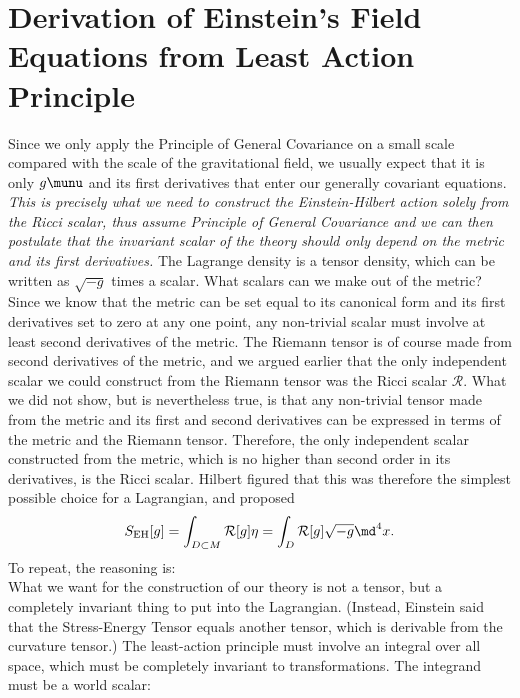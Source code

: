 \newpage
\section{Derivation of Einstein's Field Equations from Least Action Principle}

Since we only apply the Principle of General Covariance on a small scale compared with the scale of the gravitational field, we usually expect that it is only $g\munu$ and its first derivatives that enter our generally covariant equations. \emph{This is precisely what we need to construct the Einstein-Hilbert action solely from the Ricci scalar, thus assume Principle of General Covariance and we can then postulate that the invariant scalar of the theory should only depend on the metric and its first derivatives.}
The Lagrange density is a tensor density, which can be written as $\sqrt{−g }$ times a scalar. What
scalars can we make out of the metric? Since we know that the metric can be set equal to
its canonical form and its first derivatives set to zero at any one point, any non-trivial scalar
must involve at least second derivatives of the metric. The Riemann tensor is of course
made from second derivatives of the metric, and we argued earlier that the only independent
scalar we could construct from the Riemann tensor was the Ricci scalar $\mathcal{R}$. What we did not
show, but is nevertheless true, is that any non-trivial tensor made from the metric and its
first and second derivatives can be expressed in terms of the metric and the Riemann tensor.
Therefore, the only independent scalar constructed from the metric, which is no higher than
second order in its derivatives, is the Ricci scalar. Hilbert figured that this was therefore the
simplest possible choice for a Lagrangian, and proposed
\begin{equation}
	S_{\mathrm{EH}} [g] = \int_{D\subset M} \mathcal{R}[g] \eta = \int_D \mathcal{R}[g] \sqrt{-g} \md^4 x.
\end{equation}
To repeat, the reasoning is:\\
What we want for the construction of our theory is not a tensor, but a completely invariant thing to put into the Lagrangian. (Instead, Einstein said that the Stress-Energy Tensor equals another tensor, which is derivable from the curvature tensor.) The least-action principle must involve an integral over all space, which must be completely invariant to transformations. The integrand must be a world scalar:
